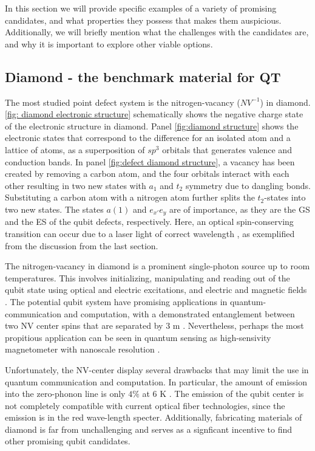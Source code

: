 In this section we will provide specific examples of a variety of promising candidates, and what properties they possess that makes them auspicious. Additionally, we will briefly mention what the challenges with the candidates are, and why it is important to explore other viable options.

\subsection{Diamond - the benchmark material for QT}
\label{diamond}



The most studied point defect system is the nitrogen-vacancy ($NV^{-1}$) in diamond. \autoref{fig: diamond electronic structure} schematically shows the negative charge state of the electronic structure in diamond. Panel \autoref{fig:diamond structure} shows the electronic states that correspond to the difference for an isolated atom and a lattice of atoms, as a superposition of $sp^3$ orbitals that generates valence and conduction bands. In panel \autoref{fig:defect diamond structure}, a vacancy has been created by removing a carbon atom, and the four orbitals interact with each other resulting in two new states with $a_1$ and $t_2$ symmetry due to dangling bonds. Substituting a carbon atom with a nitrogen atom further splits the $t_2$-states into two new states. The states $a(1)$ and $e_{x'}e_y$ are of importance, as they are the GS and the ES of the qubit defects, respectively. Here, an optical spin-conserving transition can occur due to a laser light of correct wavelength \cite{Gordon2013}, as exemplified from the discussion from the last section.

\noindent The nitrogen-vacancy in diamond is a prominent single-photon source up to room temperatures. This involves initializing, manipulating and reading out of the qubit state using optical and electric excitations, and electric and magnetic fields \cite{Gordon2013}. The potential qubit system have promising applications in quantum- communication and computation, with a demonstrated entanglement between two NV center spins that are separated by $3$ m \cite{Bernien2013}. Nevertheless, perhaps the most propitious application can be seen in quantum sensing as high-sensivity magnetometer with nanoscale resolution \cite{Taylor2008}.

Unfortunately, the NV-center display several drawbacks that may limit the use in quantum communication and computation. In particular, the amount of emission into the zero-phonon line is only $4 \%$ at $6$ K \cite{Barclay2011}. The emission of the qubit center is not completely compatible with current optical fiber technologies, since the emission is in the red wave-length specter. Additionally, fabricating materials of diamond is far from unchallenging and serves as a signficant incentive to find other promising qubit candidates.

